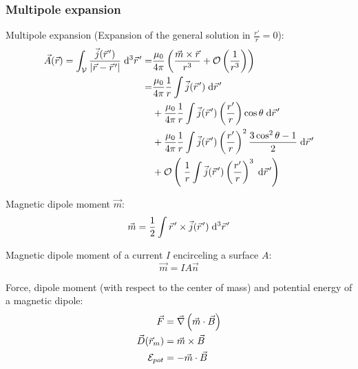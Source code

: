 		\subsubsection{Multipole expansion}
			\noindent
			Multipole expansion (Expansion of the general solution in $\frac{r'}{r}=0$):
			\begin{equation}
				\begin{aligned}
					\vec{A}(\vec{r}) = \int_{\mathcal{V}} \frac{\vec{j}(\pvec{r}')}{\left|\vec{r}-\pvec{r}'\right|} \;\diff^3\pvec{r}'
					=& \frac{\mu_0}{4\pi} \left(\frac{\vec{m}\times\vec{r}}{r^3} + \mathcal{O}\left(\frac{1}{r^3}\right)\right) \\
					=& \frac{\mu_0}{4\pi}\frac{1}{r}\int\vec{j}(\pvec{r}')\;\diff \pvec{r}' \\
					&+ \frac{\mu_0}{4\pi}\frac{1}{r}\int\vec{j}(\pvec{r}')\left(\frac{r'}{r}\right)\cos\theta\;\diff \pvec{r}' \\
					&+ \frac{\mu_0}{4\pi}\frac{1}{r}\int\vec{j}(\pvec{r}')\left(\frac{r'}{r}\right)^2\frac{3\cos^2\theta-1}{2}\;\diff \pvec{r}' \\
					&+ \mathcal{O}\left(\;\frac{1}{r}\int\vec{j}(\pvec{r}')\left(\frac{r'}{r}\right)^3 \;\diff \pvec{r}'\right) \\
				\end{aligned}
			\end{equation}

			\noindent
			Magnetic dipole moment $\vec{m}$:
			\begin{equation}
				\begin{aligned}
					\vec{m} = \frac{1}{2}\int \pvec{r}'\times\vec{j}(\pvec{r}')\;\diff^3\pvec{r}'
				\end{aligned}
			\end{equation}

			\noindent
			Magnetic dipole moment of a current $I$ encirceling a surface $A$:
			\begin{equation}
				\vec{m} = IA\vec{n}
			\end{equation}

			\noindent
			Force, dipole moment (with respect to the center of mass) and potential energy of a magnetic dipole:
			\begin{equation}
				\begin{aligned}
					\vec{F} &= \vec{\nabla}\left(\vec{m}\cdot\vec{B}\right) \\
					\vec{D}(\vec{r}_m) &= \vec{m}\times\vec{B} \\
					\mathcal{E}_{pot} &= -\vec{m}\cdot\vec{B} \\
				\end{aligned}
			\end{equation}

